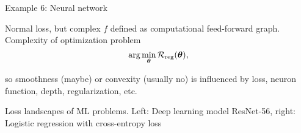 \documentclass[11pt,compress,t,notes=noshow, xcolor=table]{beamer}
\begin{document}
\begin{framei}{Example 6: Neural network}
\item Normal loss, but complex $f$ defined as computational feed-forward graph. Complexity of optimization problem
$$ \text{arg} \min_{\bm{\theta}} \mathcal{R}_{\text{reg}}(\bm{\theta}), $$
\item so smoothness (maybe) or convexity (usually no) is influenced by loss, neuron function, depth, regularization, etc.
\vfill
{}
\begin{center} \begin{small}
Loss landscapes of ML problems. Left: Deep learning model ResNet-56, right: Logistic regression with cross-entropy loss
\end{small} \end{center}
\end{framei}

\endlecture
\end{document}
